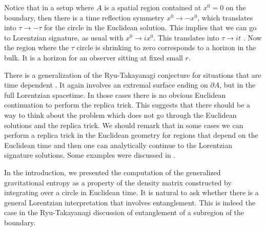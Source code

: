Notice that in a setup where $A$ is a spatial region contained at $x^0=0$ on the boundary, then there is a time
reflection symmetry $x^0 \to - x^0$, which translates into $\tau \to -\tau$ for the circle in the Euclidean solution.
This implies that we can go to Lorentzian signature, as usual with $x^0 \to i x^0$. This translates into
$\tau \to i t $ . Now the region where the $\tau$ circle is shrinking to zero corresponds to a horizon in the bulk. It is a horizon for an observer sitting at fixed small $r$.


There is a generalization of the Ryu-Takayanagi conjecture for situations
 that are time dependent \HubenyXT .
It again involves an extremal surface ending on $\partial A$, but in the full Lorentzian spacetime.
In those cases
there is no obvious Euclidean continuation to perform the replica trick. This suggests that there should
be a way to think about the problem which does not go through the Euclidean solutions and the replica trick.
We should remark that in some cases we can perform a replica trick in the Euclidean geometry for regions
that depend on the Euclidean time and then one can analytically
continue to the Lorentzian signature solutions. Some examples were discussed in \HartmanQMA .




In the introduction, we presented the computation of the generalized gravitational entropy as
a property of the density matrix constructed by integrating over a circle in Euclidean time.
It is natural to ask whether there is a general Lorentzian interpretation that involves entanglement.
This is indeed  the case   in the Ryu-Takayanagi discussion of entanglement of a subregion of the boundary.

\ifig{} {}


